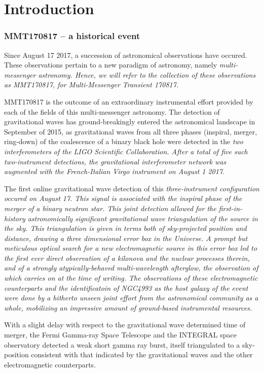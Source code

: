 \part{Introduction}

\section{MMT170817 -- a historical event}
Since August 17 2017, a succession of astronomical observations have occured. These observations pertain to a new paradigm of astronomy, namely \it{multi-messenger astronomy}. Hence, we will refer to the collection of these observations as MMT170817, for \it{Multi-Messenger Transient 170817}.

MMT170817 is the outcome of an extraordinary instrumental effort provided by each of the fields of this multi-messenger astronomy. The detection of gravitational waves has ground-breakingly entered the astronomical landscape in September of 2015, as gravitational waves from all three phases (inspiral, merger, ring-down) of the coalescence of a binary black hole were detected in the \it{two} interferometers of the LIGO Scientific Collaboration. After a total of five such two-instrument detections, the gravitational interferometer network was augmented with the French-Italian Virgo instrument on August 1 2017.

The first online gravitational wave detection of this \it{three}-instrument configuration occured on August 17. This signal is associated with the inspiral phase of the merger of a binary neutron star. This joint detection allowed for the first-in-history astronomically significant gravitational wave triangulation of the source in the sky. This triangulation is given in terms both of sky-projected position and distance, drawing a three dimensional error box in the Universe. A prompt but meticulous optical search for a new electromagnetic source in this error box led to the first ever direct observation of a kilonova and the nuclear processes therein, and of a strongly atypically-behaved multi-wavelength afterglow, the observation of which carries on at the time of writing. The observations of these electromagnetic counterparts and the identificatoin of NGC4993 as the host galaxy of the event were done by a hitherto unseen joint effort from the astronomical community as a whole, mobilizing an impressive amount of ground-based instrumental resources.

With a slight delay with respect to the gravitational wave determined time of merger, the Fermi Gamma-ray Space Telescope and the INTEGRAL space observatory detected a weak short gamma ray burst, itself triangulated to a sky-position consistent with that indicated by the gravitational waves and the other electromagnetic counterparts.


